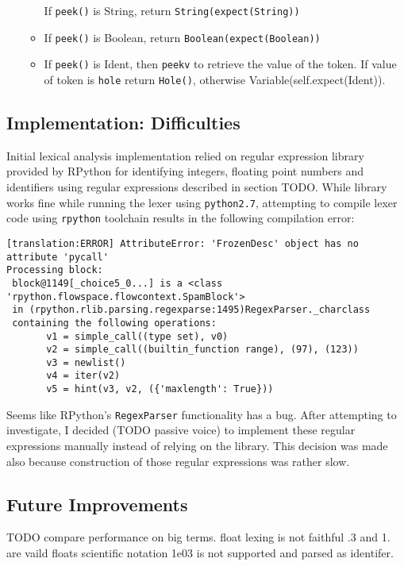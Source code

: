\begin{itemize}
\begin{itemize}
		If \texttt{peek()} is String, return \texttt{String(expect(String))}
	\item
		If \texttt{peek()} is Boolean, return \texttt{Boolean(expect(Boolean))}
	\item

		If \texttt{peek()} is Ident, then \texttt{peekv} to retrieve the value of the token. If value of token is \texttt{hole} return \texttt{Hole()}, otherwise Variable(self.expect(Ident)).
	\end{itemize}
	

\end{itemize}

\subsection{Implementation: Difficulties}
Initial lexical analysis implementation relied on regular expression library provided by RPython for identifying integers, floating point numbers and identifiers using regular expressions described in section TODO. While library works fine while running the lexer using \texttt{python2.7}, attempting to compile lexer code using \texttt{rpython} toolchain results in the following compilation error:

\begin{lstlisting}
[translation:ERROR] AttributeError: 'FrozenDesc' object has no attribute 'pycall'
Processing block:
 block@1149[_choice5_0...] is a <class 'rpython.flowspace.flowcontext.SpamBlock'> 
 in (rpython.rlib.parsing.regexparse:1495)RegexParser._charclass 
 containing the following operations: 
       v1 = simple_call((type set), v0) 
       v2 = simple_call((builtin_function range), (97), (123)) 
       v3 = newlist() 
       v4 = iter(v2) 
       v5 = hint(v3, v2, ({'maxlength': True})) 
\end{lstlisting}

Seems like RPython's \texttt{RegexParser} functionality has a bug. After attempting to investigate, I decided (TODO passive voice) to implement these regular expressions manually instead of relying on the library. This decision was made also because construction of those regular expressions was rather slow.

\subsection{Future Improvements}
TODO compare performance on big terms. 
float lexing is not faithful .3 and 1. are vaild floats
scientific notation 1e03 is not supported and parsed as identifer.

